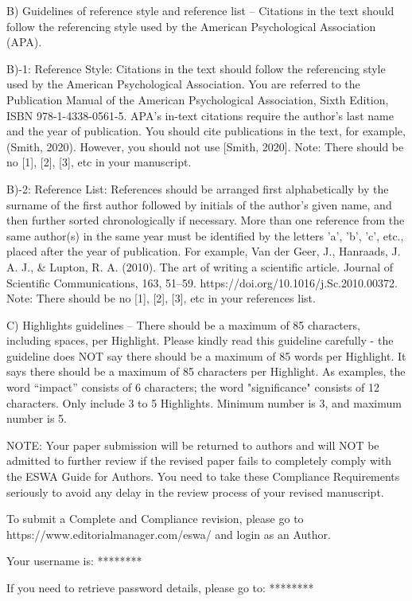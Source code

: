 \documentclass[12pt, review]{elsarticle}
\begin{document}
B)  Guidelines of reference style and reference list – Citations in the text should follow the referencing style used by the American Psychological Association (APA).  

B)-1: Reference Style:
Citations in the text should follow the referencing style used by the American Psychological Association. You are referred to the Publication Manual of the American Psychological Association, Sixth Edition, ISBN 978-1-4338-0561-5.  APA’s in-text citations require the author’s last name and the year of publication. You should cite publications in the text, for example, (Smith, 2020).  However, you should not use [Smith, 2020]. Note: There should be no [1], [2], [3], etc in your manuscript. 

B)-2: Reference List:
References should be arranged first alphabetically by the surname of the first author followed by initials of the author’s given name, and then further sorted chronologically if necessary. More than one reference from the same author(s) in the same year must be identified by the letters 'a', 'b', 'c', etc., placed after the year of publication. For example, Van der Geer, J., Hanraads, J. A. J., \& Lupton, R. A. (2010). The art of writing a scientific article. Journal of Scientific Communications, 163, 51–59. {https://doi.org/10.1016/j.Sc.2010.00372}. Note: There should be no [1], [2], [3], etc in your references list. 

C) Highlights guidelines – There should be a maximum of 85 characters, including spaces, per Highlight. Please kindly read this guideline carefully - the guideline does NOT say there should be a maximum of 85 words per Highlight.  It says there should be a maximum of 85 characters per Highlight.  As examples, the word “impact” consists of 6 characters; the word "significance" consists of 12 characters. Only include 3 to 5 Highlights. Minimum number is 3, and maximum number is 5.

NOTE: Your paper submission will be returned to authors and will NOT be admitted to further review if the revised paper fails to completely comply with the ESWA Guide for Authors. You need to take these Compliance Requirements seriously to avoid any delay in the review process of your revised manuscript.

To submit a Complete and Compliance revision, please go to {https://www.editorialmanager.com/eswa/} and login as an Author. 

Your username is: ********

If you need to retrieve password details, please go to:
******** 
\end{document}
